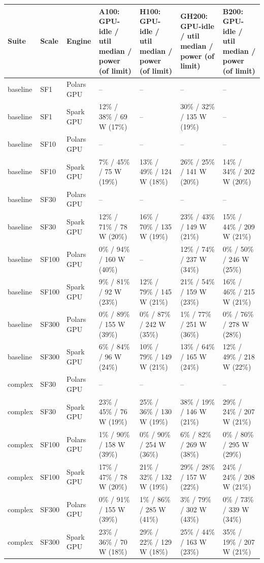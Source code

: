 \begin{longtable}{lllllll}
\toprule
Suite & Scale & Engine & A100: GPU-idle / util median / power (of limit) & H100: GPU-idle / util median / power (of limit) & GH200: GPU-idle / util median / power (of limit) & B200: GPU-idle / util median / power (of limit) \\
\midrule
\endhead
\bottomrule
\endfoot
baseline & SF1 & Polars GPU & -- & -- & -- & -- \\
baseline & SF1 & Spark GPU & 12\% / 38\% / 69 W (17\%) & -- & 30\% / 32\% / 135 W (19\%) & -- \\
baseline & SF10 & Polars GPU & -- & -- & -- & -- \\
baseline & SF10 & Spark GPU & 7\% / 45\% / 75 W (19\%) & 13\% / 49\% / 124 W (18\%) & 26\% / 25\% / 141 W (20\%) & 14\% / 34\% / 202 W (20\%) \\
baseline & SF30 & Polars GPU & -- & -- & -- & -- \\
baseline & SF30 & Spark GPU & 12\% / 71\% / 78 W (20\%) & 16\% / 70\% / 135 W (19\%) & 23\% / 43\% / 149 W (21\%) & 15\% / 44\% / 209 W (21\%) \\
baseline & SF100 & Polars GPU & 0\% / 94\% / 160 W (40\%) & -- & 12\% / 74\% / 237 W (34\%) & 0\% / 50\% / 246 W (25\%) \\
baseline & SF100 & Spark GPU & 9\% / 81\% / 92 W (23\%) & 12\% / 79\% / 145 W (21\%) & 21\% / 54\% / 159 W (23\%) & 16\% / 46\% / 215 W (21\%) \\
baseline & SF300 & Polars GPU & 0\% / 89\% / 155 W (39\%) & 0\% / 87\% / 242 W (35\%) & 1\% / 77\% / 251 W (36\%) & 0\% / 76\% / 278 W (28\%) \\
baseline & SF300 & Spark GPU & 6\% / 84\% / 96 W (24\%) & 10\% / 79\% / 149 W (21\%) & 13\% / 64\% / 165 W (24\%) & 12\% / 49\% / 218 W (22\%) \\
complex & SF30 & Polars GPU & -- & -- & -- & -- \\
complex & SF30 & Spark GPU & 23\% / 45\% / 76 W (19\%) & 25\% / 36\% / 130 W (19\%) & 38\% / 19\% / 146 W (21\%) & 29\% / 24\% / 207 W (21\%) \\
complex & SF100 & Polars GPU & 1\% / 90\% / 158 W (39\%) & 0\% / 90\% / 254 W (36\%) & 6\% / 82\% / 269 W (38\%) & 0\% / 80\% / 295 W (29\%) \\
complex & SF100 & Spark GPU & 17\% / 47\% / 78 W (20\%) & 21\% / 32\% / 132 W (19\%) & 29\% / 28\% / 157 W (22\%) & 24\% / 24\% / 208 W (21\%) \\
complex & SF300 & Polars GPU & 0\% / 91\% / 155 W (39\%) & 1\% / 86\% / 285 W (41\%) & 3\% / 79\% / 302 W (43\%) & 0\% / 73\% / 339 W (34\%) \\
complex & SF300 & Spark GPU & 23\% / 36\% / 70 W (18\%) & 29\% / 22\% / 129 W (18\%) & 25\% / 44\% / 163 W (23\%) & 35\% / 19\% / 207 W (21\%) \\
\end{longtable}
